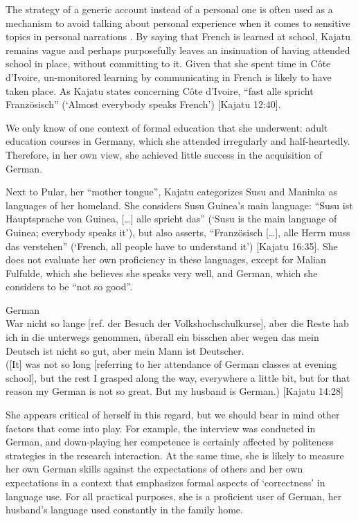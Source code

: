 \documentclass[output=paper]{langscibook}
\begin{document}
\noindent
The strategy of a generic account instead of a personal one is often used as a mechanism to avoid talking about personal experience when it comes to sensitive topics in personal narrations \citep[35]{de_fina_interview_2019}. By saying that French is learned at school, Kajatu remains vague and perhaps purposefully leaves an insinuation of having attended school in place, without committing to it. Given that she spent time in Côte d’Ivoire, un-monitored learning by communicating in French is likely to have taken place. As Kajatu states concerning Côte d’Ivoire, “fast alle spricht Französisch” (‘Almost everybody speaks French’) [Kajatu 12:40]. 

We only know of one context of formal education that she underwent: adult education courses in Germany, which she attended irregularly and half-heartedly. Therefore, in her own view, she achieved little success in the acquisition of German.

Next to Pular, her “mother tongue”, Kajatu categorizes Susu and Maninka as languages of her homeland. She considers Susu Guinea’s main language: “Susu ist Hauptsprache von Guinea, [\dots] alle spricht das” (‘Susu is the main language of Guinea; everybody speaks it’), but also asserts, “Französisch [\dots], alle Herrn muss das verstehen” (‘French, all people have to understand it’) [Kajatu 16:35]. She does not evaluate her own proficiency in these languages, except for Malian Fulfulde, which she believes she speaks very well, and German, which she considers to be “not so good”.


\begin{exe}
    \ex\label{fanego:ex:2} German \\
    War nicht so lange [ref. der Besuch der Volkshochschulkurse], aber die Reste hab ich in die unterwegs genommen, überall ein bisschen aber wegen das mein Deutsch ist nicht so gut, aber mein Mann ist Deutscher. \\
    \glt ([It] was not so long [referring to her attendance of German classes at evening school], but the rest I grasped along the way, everywhere a little bit, but for that reason my German is not so great. But my husband is German.) [Kajatu 14:28]
\end{exe}

\noindent
She appears critical of herself in this regard, but we should bear in mind other factors that come into play. For example, the interview was conducted in German, and down-playing her competence is certainly affected by politeness strategies in the research interaction. At the same time, she is likely to measure her own German skills against the expectations of others and her own expectations in a context that emphasizes formal aspects of ‘correctness’ in language use. For all practical purposes, she is a proficient user of German, her husband’s language used constantly in the family home.
\end{document}
